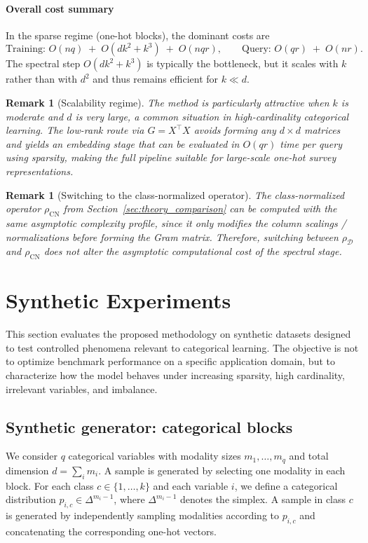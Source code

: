 \documentclass[preprint,11pt]{elsarticle}
\newtheorem{Remark}[Theorem]{Remark}
\begin{document}
\paragraph{Overall cost summary}
In the sparse regime (one-hot blocks), the dominant costs are
\[
\boxed{
\text{Training: } O(nq) \;+\; O(dk^2+k^3) \;+\; O(nqr),
\qquad
\text{Query: } O(qr) \;+\; O(nr).
}
\]
The spectral step $O(dk^2+k^3)$ is typically the bottleneck, but it scales with $k$ rather than with $d^2$ and thus remains
efficient for $k\ll d$.

\begin{Remark}[Scalability regime]
The method is particularly attractive when $k$ is moderate and $d$ is very large, a common situation in high-cardinality categorical learning.
The low-rank route via $G=X^\top X$ avoids forming any $d\times d$ matrices and yields an embedding stage that can be evaluated
in $O(qr)$ time per query using sparsity, making the full pipeline suitable for large-scale one-hot survey representations.
\end{Remark}

\begin{Remark}[Switching to the class-normalized operator]
The class-normalized operator $\rho_{\mathrm{CN}}$ from Section~\ref{sec:theory_comparison} can be computed with the same asymptotic complexity profile,
since it only modifies the column scalings / normalizations before forming the Gram matrix. Therefore, switching between
$\rho_{\mathcal D}$ and $\rho_{\mathrm{CN}}$ does not alter the asymptotic computational cost of the spectral stage.
\end{Remark}


\section{Synthetic Experiments}
\label{sec:synthetic}
This section evaluates the proposed methodology on synthetic datasets designed to test controlled phenomena relevant to categorical learning.
The objective is not to optimize benchmark performance on a specific application domain, but to characterize how the model behaves under increasing sparsity, high cardinality, irrelevant variables, and imbalance.

\subsection{Synthetic generator: categorical blocks}
We consider $q$ categorical variables with modality sizes $m_1,\dots,m_q$ and total dimension $d=\sum_i m_i$.
A sample is generated by selecting one modality in each block.
For each class $c\in\{1,\dots,k\}$ and each variable $i$, we define a categorical distribution
$p_{i,c}\in\Delta^{m_i-1}$, where $\Delta^{m_i-1}$ denotes the simplex.
A sample in class $c$ is generated by independently sampling modalities according to $p_{i,c}$ and concatenating the corresponding one-hot vectors.
\end{document}
